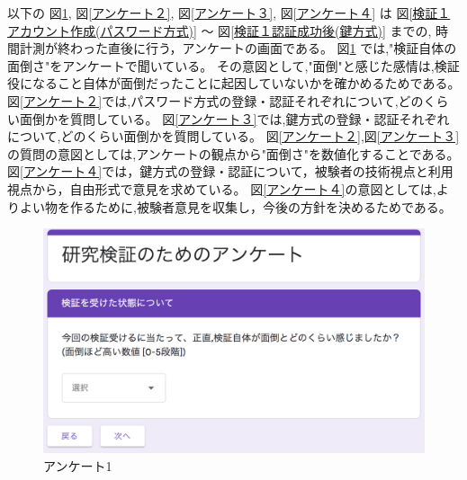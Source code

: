     以下の
    図\ref{アンケート１},
    図\ref{アンケート２},
    図\ref{アンケート３},
    図\ref{アンケート４}
    は
    図\ref{検証１アカウント作成(パスワード方式)} 〜 図\ref{検証１認証成功後(鍵方式)} までの,
    時間計測が終わった直後に行う，アンケートの画面である。
    図\ref{アンケート１} では,"検証自体の面倒さ"をアンケートで聞いている。
    その意図として,"面倒"と感じた感情は,検証役になること自体が面倒だったことに起因していないかを確かめるためである。
    図\ref{アンケート２}では,パスワード方式の登録・認証それぞれについて,どのくらい面倒かを質問している。
    図\ref{アンケート３}では,鍵方式の登録・認証それぞれについて,どのくらい面倒かを質問している。
    図\ref{アンケート２},図\ref{アンケート３}の質問の意図としては,アンケートの観点から"面倒さ"を数値化することである。
    図\ref{アンケート４}では，鍵方式の登録・認証について，被験者の技術視点と利用視点から，自由形式で意見を求めている。
    図\ref{アンケート４}の意図としては,よりよい物を作るために,被験者意見を収集し，今後の方針を決めるためである。

    \vspace{4cm}%
    \begin{figure}[H]
        \includegraphics[width=15cm]{./fig/chapter4/inspect_1/questionnaire/questionnaire_1.png}
        \caption{アンケート1}
        \label{アンケート１}
    \end{figure}

